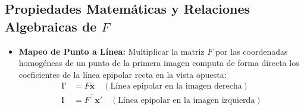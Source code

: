 \subsection{Propiedades Matemáticas y Relaciones Algebraicas de $F$}
\begin{itemize}
    \item \textbf{Mapeo de Punto a Línea:} Multiplicar la matriz $F$ por las coordenadas homogéneas de un punto de la primera imagen computa de forma directa los coeficientes de la línea epipolar recta en la vista opuesta:
    \begin{align*}
        \mathbf{l}' &= F\mathbf{x} \quad (\text{Línea epipolar en la imagen derecha}) \\
        \mathbf{l} &= F^{\top}\mathbf{x}' \quad (\text{Línea epipolar en la imagen izquierda}) 
    \end{align*}


\end{itemize}

